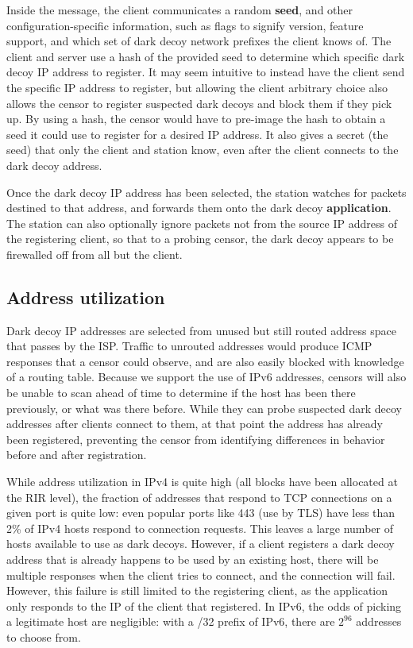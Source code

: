 \documentclass[letterpaper,twocolumn,10pt]{article}
\begin{document}
Inside the message, the client communicates a random \textbf{seed}, and other
configuration-specific information, such as flags to signify version, feature
support, and which set of dark decoy network prefixes the client knows of. The
client and server use a hash of the provided seed to determine which specific
dark decoy IP address to register. It may seem intuitive to instead have the client
send the specific IP address to register, but allowing the client arbitrary
choice also allows the censor to register suspected dark decoys and block them if
they pick up. By using a hash, the censor would have to pre-image the hash to
obtain a seed it could use to register for a desired IP address. It also gives a
secret (the seed) that only the client and station know, even after the client
connects to the dark decoy address.

Once the dark decoy IP address has been selected, the station watches for
packets destined to that address, and forwards them onto the dark decoy
\textbf{application}. The station can also optionally ignore packets not from
the source IP address of the registering client, so that to a probing censor,
the dark decoy appears to be firewalled off from all but the client.


\subsection{Address utilization}

Dark decoy IP addresses are selected from unused but still routed address
space that passes by the ISP. Traffic to unrouted addresses would produce ICMP
responses that a censor could observe, and are also easily blocked with knowledge
of a routing table. Because we support the use of IPv6 addresses, censors will
also be unable to scan ahead of time to determine if the host has been there
previously, or what was there before. While they can probe suspected dark decoy
addresses after clients connect to them, at that point the address has already been
registered, preventing the censor from identifying differences in behavior
before and after registration.

While address utilization in IPv4 is quite high (all blocks have been allocated
at the RIR level), the fraction of addresses that respond to TCP connections on
a given port is quite low: even popular ports like 443 (use by TLS) have less
than 2\% of IPv4 hosts respond to connection requests. This leaves a large
number of hosts available to use as dark decoys. However, if a client registers
a dark decoy address that is already happens to be used by an existing host,
there will be multiple responses when the client tries to connect, and the
connection will fail. However, this failure is still limited to the registering
client, as the application only responds to the IP of the client that
registered. In IPv6, the odds of picking a legitimate host are negligible: with
a /32 prefix of IPv6, there are $2^{96}$ addresses to choose from.
\end{document}
